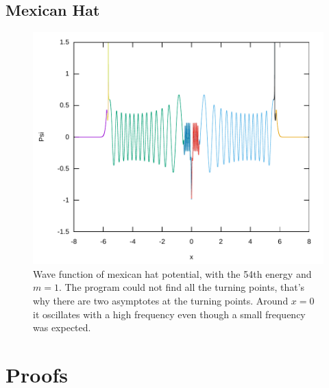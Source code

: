 \documentclass[11pt,DIV=10,final]{scrreprt} %
\begin{document}
{\begin{appendix}
\subsection{Mexican Hat}
\begin{figure}[H]
  \centering
    \includegraphics[width=\textwidth]{plots/mexican-hat-54.pdf}
    \caption{
      Wave function of mexican hat potential, with the 54th energy and $m = 1$. The program could not find all the turning points, that's why there are two asymptotes at the turning points.
      Around $x = 0$ it oscillates with a high frequency even though a small frequency was expected.
    }\label{fig:mexican-hat-54th-energy}
\end{figure}


\section{Proofs}

\end{appendix}}
\end{document}
